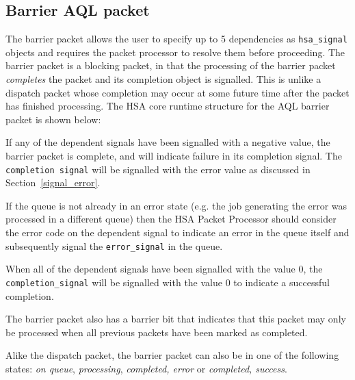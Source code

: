 \documentclass{book}
\begin{document}


\hypertarget{barrier_packet}{}\subsection{Barrier AQL
packet}\label{barrier_packet}
The barrier packet allows the user to specify up to 5 dependencies
as \texttt{hsa\_signal} objects and requires the packet processor to
resolve them before proceeding. The barrier packet is a blocking
packet, in that the processing of the barrier packet
\emph{completes} the packet and its completion object is signalled.
This is unlike a dispatch packet whose completion may occur at some
future time after the packet has finished processing. The HSA core
runtime structure for the AQL barrier packet is shown below:



If any of the dependent signals have been signalled with a negative
value, the barrier packet is complete, and will indicate failure in
its completion signal. The \texttt{completion signal} will be
signalled with the error value as discussed in
Section~\ref{signal_error}.

If the queue is not already in an error state (e.g. the job
generating the error was processed in a different queue) then the
HSA Packet Processor should consider the error code on the dependent
signal to indicate an error in the queue itself and subsequently
signal the \texttt{error\_signal} in the queue.

When all of the dependent signals have been signalled with the value
0, the \texttt{completion\_signal} will be signalled with the value 0 to
indicate a successful completion.

The barrier packet also has a barrier bit that indicates that this
packet may only be processed when all previous packets have been
marked as completed.

Alike the dispatch packet, the barrier packet can also be in one of
the following states: \emph{on queue}, \emph{processing},
\emph{completed, error} or \emph{completed, success}.
\end{document}
